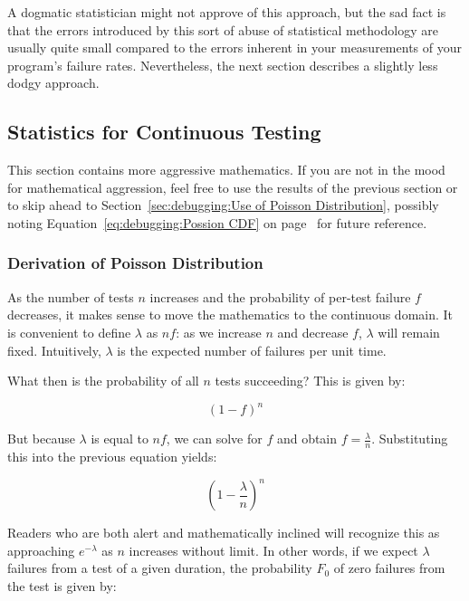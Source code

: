 A dogmatic statistician might not approve of this approach, but the
sad fact is that the errors introduced by this sort of abuse of
statistical methodology are usually quite small compared to the
errors inherent in your measurements of your program's failure rates.
Nevertheless, the next section describes a slightly less dodgy approach.

\subsection{Statistics for Continuous Testing}
\label{sec:debuggingStatistics for Continuous Testing}

This section contains more aggressive mathematics.
If you are not in the mood for mathematical aggression, feel free to
use the results of the previous section or to skip
ahead to
Section~\ref{sec:debugging:Use of Poisson Distribution},
possibly noting Equation~\ref{eq:debugging:Possion CDF}
on page~\pageref{eq:debugging:Possion CDF} for future reference.

\subsubsection{Derivation of Poisson Distribution}
\label{sec:debugging:Derivation of Poisson Distribution}

As the number of tests $n$ increases and the probability of per-test
failure $f$ decreases, it makes sense to move the mathematics to the
continuous domain.
It is convenient to define $\lambda$ as $nf$: as we increase $n$ and
decrease $f$, $\lambda$ will remain fixed.
Intuitively, $\lambda$ is the expected number of failures per unit time.

What then is the probability of all $n$ tests succeeding?
This is given by:

\begin{equation}
	(1 - f)^n
\end{equation}

But because $\lambda$ is equal to $nf$, we can solve for $f$ and obtain
$f=\frac{\lambda}{n}$.
Substituting this into the previous equation yields:

\begin{equation}
	\left(1 - \frac{\lambda}{n} \right)^n
\end{equation}

Readers who are both alert and mathematically inclined will recognize
this as approaching $e^{-\lambda}$ as $n$ increases without limit.
In other words, if we expect $\lambda$ failures from a test of a given duration,
the probability $F_0$ of zero failures from the test is given by:


